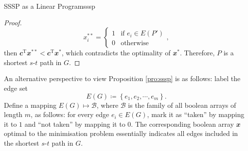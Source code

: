 \documentclass[math, code]{amznotes}
\theoremstyle{remark}
\begin{document}
\begin{probox}{SSSP as a Linear Program}{sssp}
\begin{proof}
        \begin{equation*}
            x^{**}_i = \begin{cases}
                1 & \textrm{if } e_i \in E(P') \\
                0 & \textrm{otherwise}
            \end{cases},
        \end{equation*}
        then $\mathbfit{c}^{\mathrm{T}}\mathbfit{x}^{**} < \mathbfit{c}^{\mathrm{T}}\mathbfit{x}^{*}$, which contradicts the optimality of $\mathbfit{x}^*$. Therefore, $P$ is a shortest $s$-$t$ path in $G$. 
    \end{proof}
\end{probox}
An alternative perspective to view Proposition \ref{pro:sssp} is as follows: label the edge set 
\begin{equation*}
    E(G) \coloneqq \left\{e_1, e_2, \cdots, e_m\right\}.
\end{equation*}
Define a mapping $E(G) \mapsto \mathcal{B}$, where $\mathcal{B}$ is the family of all boolean arrays of length $m$, as follows: for every edge $e_i \in E(G)$, mark it as ``taken'' by mapping it to $1$ and ``not taken'' by mapping it to $0$. The corresponding boolean array $\mathbfit{x}$ optimal to the minimisation problem essentially indicates all edges included in the shortest $s$-$t$ path in $G$.
\end{document}
